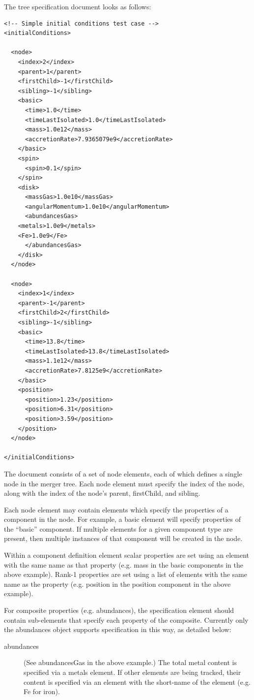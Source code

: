 The tree specification document looks as follows:
\begin{verbatim}
<!-- Simple initial conditions test case -->
<initialConditions>

  <node>
    <index>2</index>
    <parent>1</parent>
    <firstChild>-1</firstChild>
    <sibling>-1</sibling>
    <basic>
      <time>1.0</time>
      <timeLastIsolated>1.0</timeLastIsolated>
      <mass>1.0e12</mass>
      <accretionRate>7.9365079e9</accretionRate>
    </basic>
    <spin>
      <spin>0.1</spin>
    </spin>
    <disk>
      <massGas>1.0e10</massGas>
      <angularMomentum>1.0e10</angularMomentum>
      <abundancesGas>
	<metals>1.0e9</metals>
	<Fe>1.0e9</Fe>
      </abundancesGas>
    </disk>
  </node>

  <node>
    <index>1</index>
    <parent>-1</parent>
    <firstChild>2</firstChild>
    <sibling>-1</sibling>
    <basic>
      <time>13.8</time>
      <timeLastIsolated>13.8</timeLastIsolated>
      <mass>1.1e12</mass>
      <accretionRate>7.8125e9</accretionRate>
    </basic>
    <position>
      <position>1.23</position>
      <position>6.31</position>
      <position>3.59</position>
    </position>
  </node>

</initialConditions>
\end{verbatim}
The document consists of a set of {\normalfont \ttfamily node} elements, each of which defines a single node in the merger tree. Each {\normalfont \ttfamily node} element must specify the {\normalfont \ttfamily index} of the node, along with the index of the node's {\normalfont \ttfamily parent}, {\normalfont \ttfamily firstChild}, and {\normalfont \ttfamily sibling}. 

Each {\normalfont \ttfamily node} element may contain elements which specify the properties of a component in the node. For example, a {\normalfont \ttfamily basic} element will specify properties of the ``basic'' component. If multiple elements for a given component type are present, then multiple instances of that component will be created in the node.

Within a component definition element scalar properties are set using an element with the same name as that property (e.g. {\normalfont \ttfamily mass} in the {\normalfont \ttfamily basic} components in the above example). Rank-1 properties are set using a list of elements with the same name as the property (e.g. {\normalfont \ttfamily position} in the {\normalfont \ttfamily position} component in the above example).

For composite properties (e.g. abundances), the specification element should contain sub-elements that specify each property of the composite. Currently only the {\normalfont \ttfamily abundances} object supports specification in this way, as detailed below:
\begin{description}
 \item [{\normalfont \ttfamily abundances}] (See {\normalfont \ttfamily abundancesGas} in the above example.) The total metal content is specified via a {\normalfont \ttfamily metals} element. If other elements are being tracked, their content is specified via an element with the short-name of the element (e.g. {\normalfont \ttfamily Fe} for iron).
\end{description}

